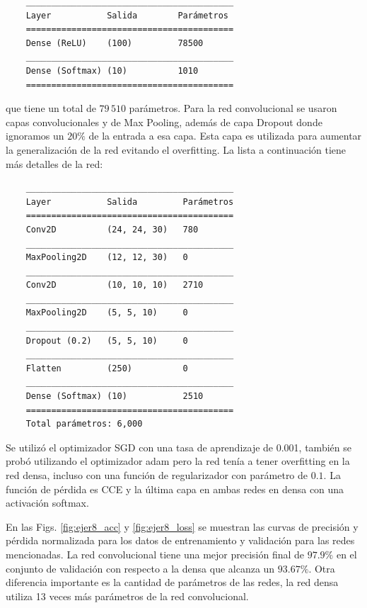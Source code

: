     \begin{verbatim}
    _________________________________________
    Layer           Salida        Parámetros   
    =========================================
    Dense (ReLU)    (100)         78500     
    _________________________________________
    Dense (Softmax) (10)          1010      
    =========================================
    \end{verbatim}
    que tiene un total de  $79\,510$ parámetros. Para la red convolucional se usaron capas convolucionales y  de Max Pooling, además de capa Dropout donde ignoramos un $20\%$ de la entrada a esa capa. Esta capa es utilizada para aumentar la generalización de la red evitando el overfitting. La lista a continuación tiene más detalles de la red:
    \begin{verbatim}
    _________________________________________
    Layer           Salida         Parámetros
    =========================================
    Conv2D          (24, 24, 30)   780     
    _________________________________________
    MaxPooling2D    (12, 12, 30)   0       
    _________________________________________
    Conv2D          (10, 10, 10)   2710    
    _________________________________________
    MaxPooling2D    (5, 5, 10)     0       
    _________________________________________
    Dropout (0.2)   (5, 5, 10)     0       
    _________________________________________
    Flatten         (250)          0       
    _________________________________________
    Dense (Softmax) (10)           2510    
    =========================================
    Total parámetros: 6,000
    \end{verbatim}

    Se utilizó el optimizador SGD con una tasa de aprendizaje de 0.001, también se probó utilizando el optimizador  adam pero la red tenía a tener overfitting en la red densa, incluso con una función de regularizador con parámetro de $0.1$. La función de pérdida es CCE y la última capa en ambas redes en densa con una activación softmax.

    En las Figs. \ref{fig:ejer8_acc} y \ref{fig:ejer8_loss} se muestran las curvas de precisión y pérdida normalizada para los datos de entrenamiento y validación para las redes mencionadas. La red convolucional tiene una mejor precisión final de $97.9\%$ en el conjunto de validación con respecto a la densa que alcanza un $93.67\%$. Otra diferencia importante es la cantidad de parámetros de las redes, la red densa utiliza  13 veces más parámetros de la red convolucional.

